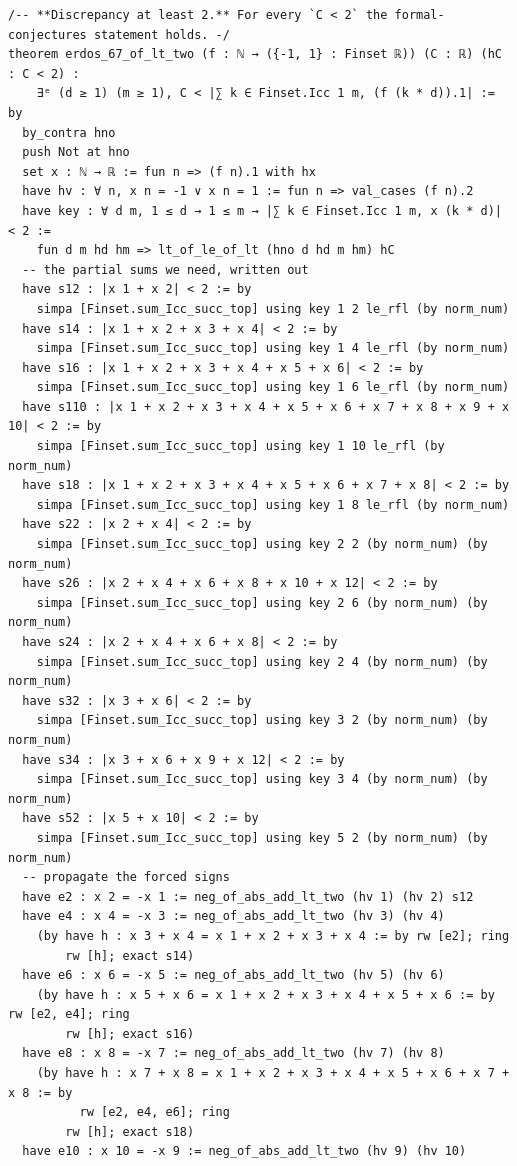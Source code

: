 \begin{verbatim}
/-- **Discrepancy at least 2.** For every `C < 2` the formal-conjectures statement holds. -/
theorem erdos_67_of_lt_two (f : ℕ → ({-1, 1} : Finset ℝ)) (C : ℝ) (hC : C < 2) :
    ∃ᵉ (d ≥ 1) (m ≥ 1), C < |∑ k ∈ Finset.Icc 1 m, (f (k * d)).1| := by
  by_contra hno
  push Not at hno
  set x : ℕ → ℝ := fun n => (f n).1 with hx
  have hv : ∀ n, x n = -1 ∨ x n = 1 := fun n => val_cases (f n).2
  have key : ∀ d m, 1 ≤ d → 1 ≤ m → |∑ k ∈ Finset.Icc 1 m, x (k * d)| < 2 :=
    fun d m hd hm => lt_of_le_of_lt (hno d hd m hm) hC
  -- the partial sums we need, written out
  have s12 : |x 1 + x 2| < 2 := by
    simpa [Finset.sum_Icc_succ_top] using key 1 2 le_rfl (by norm_num)
  have s14 : |x 1 + x 2 + x 3 + x 4| < 2 := by
    simpa [Finset.sum_Icc_succ_top] using key 1 4 le_rfl (by norm_num)
  have s16 : |x 1 + x 2 + x 3 + x 4 + x 5 + x 6| < 2 := by
    simpa [Finset.sum_Icc_succ_top] using key 1 6 le_rfl (by norm_num)
  have s110 : |x 1 + x 2 + x 3 + x 4 + x 5 + x 6 + x 7 + x 8 + x 9 + x 10| < 2 := by
    simpa [Finset.sum_Icc_succ_top] using key 1 10 le_rfl (by norm_num)
  have s18 : |x 1 + x 2 + x 3 + x 4 + x 5 + x 6 + x 7 + x 8| < 2 := by
    simpa [Finset.sum_Icc_succ_top] using key 1 8 le_rfl (by norm_num)
  have s22 : |x 2 + x 4| < 2 := by
    simpa [Finset.sum_Icc_succ_top] using key 2 2 (by norm_num) (by norm_num)
  have s26 : |x 2 + x 4 + x 6 + x 8 + x 10 + x 12| < 2 := by
    simpa [Finset.sum_Icc_succ_top] using key 2 6 (by norm_num) (by norm_num)
  have s24 : |x 2 + x 4 + x 6 + x 8| < 2 := by
    simpa [Finset.sum_Icc_succ_top] using key 2 4 (by norm_num) (by norm_num)
  have s32 : |x 3 + x 6| < 2 := by
    simpa [Finset.sum_Icc_succ_top] using key 3 2 (by norm_num) (by norm_num)
  have s34 : |x 3 + x 6 + x 9 + x 12| < 2 := by
    simpa [Finset.sum_Icc_succ_top] using key 3 4 (by norm_num) (by norm_num)
  have s52 : |x 5 + x 10| < 2 := by
    simpa [Finset.sum_Icc_succ_top] using key 5 2 (by norm_num) (by norm_num)
  -- propagate the forced signs
  have e2 : x 2 = -x 1 := neg_of_abs_add_lt_two (hv 1) (hv 2) s12
  have e4 : x 4 = -x 3 := neg_of_abs_add_lt_two (hv 3) (hv 4)
    (by have h : x 3 + x 4 = x 1 + x 2 + x 3 + x 4 := by rw [e2]; ring
        rw [h]; exact s14)
  have e6 : x 6 = -x 5 := neg_of_abs_add_lt_two (hv 5) (hv 6)
    (by have h : x 5 + x 6 = x 1 + x 2 + x 3 + x 4 + x 5 + x 6 := by rw [e2, e4]; ring
        rw [h]; exact s16)
  have e8 : x 8 = -x 7 := neg_of_abs_add_lt_two (hv 7) (hv 8)
    (by have h : x 7 + x 8 = x 1 + x 2 + x 3 + x 4 + x 5 + x 6 + x 7 + x 8 := by
          rw [e2, e4, e6]; ring
        rw [h]; exact s18)
  have e10 : x 10 = -x 9 := neg_of_abs_add_lt_two (hv 9) (hv 10)

\end{verbatim}
